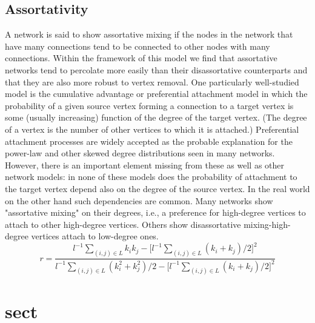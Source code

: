 \documentclass[final, paper=letter,5p,times,twocolumn]{elsarticle}
\begin{document}
\subsection{Assortativity}

A network is said to show assortative mixing if the nodes in the network that have many connections tend to be connected to other nodes with many connections. Within the framework of this model we find that assortative networks tend to percolate more easily than their disassortative counterparts and that they are also more robust to vertex removal. One particularly well-studied model is the cumulative advantage or preferential attachment model in which the probability of a given source vertex forming a connection to a target vertex is some (usually increasing) function of the degree of the target vertex. (The degree of a vertex is the number of other vertices to which it is attached.) Preferential attachment processes are widely accepted as the probable explanation for the power-law and other skewed degree distributions seen in many networks. However, there is an important element missing from these as well as other network models: in none of these models does the probability of attachment to the target vertex depend also on the degree of the source vertex. In the real world on the other hand such dependencies are common. Many networks show "assortative mixing" on their degrees, i.e., a preference for high-degree vertices to attach to other high-degree vertices. Others show disassortative mixing-high-degree vertices attach to low-degree ones.\\


$$
r = \frac{l^{-1} \sum_{(i,j) \in L} k_{i}k_{j} - \lbrack l^{-1} \sum_{(i,j) \in L} (k_{i} + k_{j})/2 \rbrack^{2}}{l^{-1} \sum_{(i,j) \in L} (k_{i}^{2} + k_{j}^{2})/2 - \lbrack l^{-1} \sum_{(i,j) \in L} (k_{i} + k_{j})/2 \rbrack^{2}}
$$

\section{sect}

\end{document}
